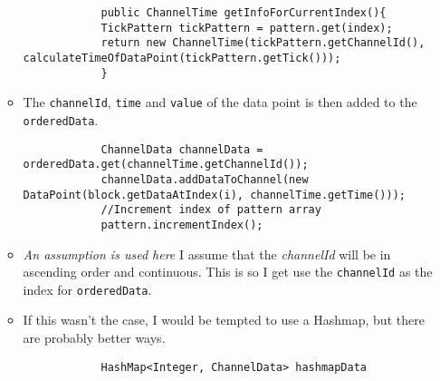 \documentclass{article}
\begin{document}
\begin{itemize}
\begin{itemize}
\begin{lstlisting}
			public ChannelTime getInfoForCurrentIndex(){
			TickPattern tickPattern = pattern.get(index);
			return new ChannelTime(tickPattern.getChannelId(), calculateTimeOfDataPoint(tickPattern.getTick()));
			}
			\end{lstlisting}
			\item The \texttt{channelId}, \texttt{time} and \texttt{value} of the data point is then added to the \texttt{orderedData}.
			\begin{lstlisting}
			ChannelData channelData = orderedData.get(channelTime.getChannelId());
			channelData.addDataToChannel(new DataPoint(block.getDataAtIndex(i), channelTime.getTime()));
			//Increment index of pattern array
			pattern.incrementIndex();
			\end{lstlisting}
			\item \emph{An assumption is used here} I assume that the \emph{channelId} will be in ascending order and continuous. This is so I get use the \texttt{channelId} as the index for \texttt{orderedData}.
			\item If this wasn't the case, I would be tempted to use a Hashmap, but there are probably better ways.
			\begin{lstlisting}
			HashMap<Integer, ChannelData> hashmapData
			\end{lstlisting}
			
			
		\end{itemize}
		
		
	\end{itemize}

	
\end{document}
